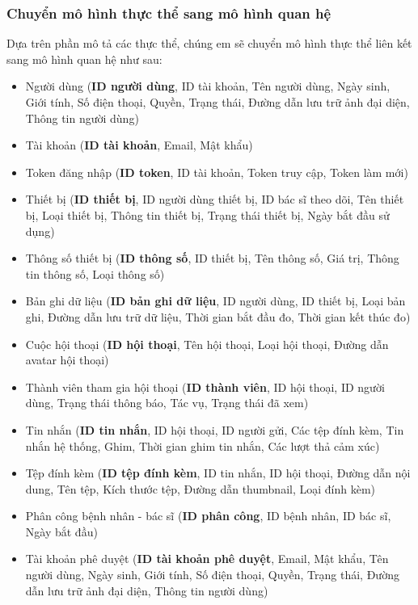 \subsubsection{Chuyển mô hình thực thể sang mô hình quan hệ}
Dựa trên phần mô tả các thực thể, chúng em sẽ chuyển mô hình thực thể liên kết sang mô hình quan hệ như sau:

\begin{itemize}
  \item Người dùng (\textbf{ID người dùng}, ID tài khoản, Tên người dùng, Ngày sinh, Giới tính, Số điện thoại, Quyền, Trạng thái, Đường dẫn lưu trữ ảnh đại diện, Thông tin người dùng)
  \item Tài khoản (\textbf{ID tài khoản}, Email, Mật khẩu)
  \item Token đăng nhập (\textbf{ID token}, ID tài khoản, Token truy cập, Token làm mới)
  \item Thiết bị (\textbf{ID thiết bị}, ID người dùng thiết bị, ID bác sĩ theo dõi, Tên thiết bị, Loại thiết bị, Thông tin thiết bị, Trạng thái thiết bị, Ngày bắt đầu sử dụng)
  \item Thông số thiết bị (\textbf{ID thông số}, ID thiết bị, Tên thông số, Giá trị, Thông tin thông số, Loại thông số)
  \item Bản ghi dữ liệu (\textbf{ID bản ghi dữ liệu}, ID người dùng, ID thiết bị, Loại bản ghi, Đường dẫn lưu trữ dữ liệu, Thời gian bắt đầu đo, Thời gian kết thúc đo)
  \item Cuộc hội thoại (\textbf{ID hội thoại}, Tên hội thoại, Loại hội thoại, Đường dẫn avatar hội thoại)
  \item Thành viên tham gia hội thoại (\textbf{ID thành viên}, ID hội thoại, ID người dùng, Trạng thái thông báo, Tác vụ, Trạng thái đã xem)
  \item Tin nhắn (\textbf{ID tin nhắn}, ID hội thoại, ID người gửi, Các tệp đính kèm, Tin nhắn hệ thống, Ghim, Thời gian ghim tin nhắn, Các lượt thả cảm xúc)
  \item Tệp đính kèm (\textbf{ID tệp đính kèm}, ID tin nhắn, ID hội thoại, Đường dẫn nội dung, Tên tệp, Kích thước tệp, Đường dẫn thumbnail, Loại đính kèm)
  \item Phân công bệnh nhân - bác sĩ (\textbf{ID phân công}, ID bệnh nhân, ID bác sĩ, Ngày bắt đầu)
  \item Tài khoản phê duyệt (\textbf{ID tài khoản phê duyệt}, Email, Mật khẩu, Tên người dùng, Ngày sinh, Giới tính, Số điện thoại, Quyền, Trạng thái, Đường dẫn lưu trữ ảnh đại diện, Thông tin người dùng)
\end{itemize}

